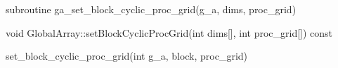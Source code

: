 \documentclass[12pt]{article}
\begin{document}
\begin{fapi}
\begin{fcode}
subroutine ga_set_block_cyclic_proc_grid(g_a, dims, proc_grid)
\end{fcode}
\begin{funcargs}
\end{funcargs}
\end{fapi}

\begin{cxxapi}
\begin{cxxcode}
void GlobalArray::setBlockCyclicProcGrid(int dims[], int proc_grid[]) const
\end{cxxcode}
\begin{funcargs}
\end{funcargs}
\end{cxxapi}

\begin{pyapi}
\begin{pycode}
set_block_cyclic_proc_grid(int g_a, block, proc_grid)
\end{pycode}
\end{pyapi}
\gcoll
\end{document}
